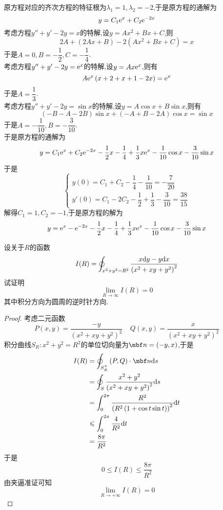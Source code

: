 \documentclass{ctexart}
\begin{document}
\begin{solution}
    原方程对应的齐次方程的特征根为$\lambda_1=1,\lambda_2=-2$,于是原方程的通解为
    \[y=C_1\mathrm{e}^{x}+C_2\mathrm{e}^{-2x}\]
    考虑方程$y''+y'-2y=x$的特解,设$y=Ax^2+Bx+C$,则
    \[2A+(2Ax+B)-2\left(Ax^2+Bx+C\right)=x\]
    于是$A=0,B=-\dfrac12,C=-\dfrac14$.\\
    考虑方程$y''+y'-2y=\mathrm{e}^x$的特解,设$y=Ax\mathrm{e}^x$,则有
    \[A\mathrm{e}^x\left(x+2+x+1-2x\right)=\mathrm{e}^x\]
    于是$A=\dfrac13$.\\
    考虑方程$y''+y'-2y=\sin x$的特解,设$y=A\cos x+B\sin x$,则有
    \[(-B-A-2B)\sin x+(-A+B-2A)\cos x=\sin x\]
    于是$A=-\dfrac{1}{10},B=-\dfrac{3}{10}$.\\
    于是原方程的通解为
    \[y=C_1\mathrm{e}^{x}+C_2\mathrm{e}^{-2x}-\dfrac12x-\dfrac14+\dfrac13x\mathrm{e}^x-\dfrac{1}{10}\cos x-\dfrac{3}{10}\sin x\]
    于是
    \[\left\{\begin{array}{l}
        y(0)=C_1+C_2-\dfrac14-\dfrac{1}{10}=-\dfrac{7}{20}\\
        y'(0)=C_1-2C_2-\dfrac12+\dfrac{1}{3}-\dfrac{3}{10}=\dfrac{38}{15}
    \end{array}\right.\]
    解得$C_1=1,C_2=-1$,于是原方程的解为
    \[y=\mathrm{e}^{x}-\mathrm{e}^{-2x}-\dfrac12x-\dfrac14+\dfrac13x\mathrm{e}^x-\dfrac{1}{10}\cos x-\dfrac{3}{10}\sin x\]

\end{solution}
\begin{problem}[4.(10\songti{分})]
    设关于$R$的函数
    \[I(R)=\oint_{x^2+y^2=R^2}\dfrac{x\mathrm{d} y-y\mathrm{d} x}{\left(x^2+xy+y^2\right)^2}\]
    试证明
    \[\lim_{R\to\infty}I(R)=0\]
    其中积分方向为圆周的逆时针方向.
\end{problem}
\begin{proof}
    考虑二元函数
    \[P(x,y)=\dfrac{-y}{\left(x^2+xy+y^2\right)^2}\ \ \ \ \ Q(x,y)=\dfrac{x}{\left(x^2+xy+y^2\right)^2}\]
    积分曲线$S_R:x^2+y^2=R^2$的单位切向量为$\mbf n=(-y,x)$,于是
    \[\begin{aligned}
        I(R)
        &= \oint_{S_R^+}\left(P,Q\right)\cdot\mbf n\di s \\
        &= \oint_S\dfrac{x^2+y^2}{\left(x^2+xy+y^2\right)^2}\di s \\
        &= \int_0^{2\pi}\dfrac{R^2}{\left(R^2\left(1+\cos t\sin t\right)\right)^2}\di t \\
        &\leqslant \int_0^{2\pi}\dfrac{4}{R^2}\di t \\
        &= \dfrac{8\pi}{R^2}
    \end{aligned}\]
    于是
    \[0\leqslant I(R)\leqslant \dfrac{8\pi}{R^2}\]
    由夹逼准证可知
    \[\lim_{R\to+\infty}I(R)=0\]

\end{proof}
\end{document}
